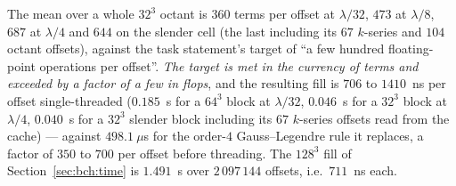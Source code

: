 The mean over a whole $32^3$ octant is $360$ terms per offset at $\lambda/32$, $473$ at
$\lambda/8$, $687$ at $\lambda/4$ and $644$ on the slender cell (the last including its
$67$ $k$-series and $104$ octant offsets), against the task statement's target of ``a few
hundred floating-point operations per offset''. \emph{The target is met in the currency of
terms and exceeded by a factor of a few in flops}, and the resulting fill is $706$ to
$1410$~ns per offset single-threaded ($0.185$~s for a $64^3$ block at $\lambda/32$,
$0.046$~s for a $32^3$ block at $\lambda/4$, $0.040$~s for a $32^3$ slender block including
its $67$ $k$-series offsets read from the cache) --- against $498.1~\mu$s for the order-$4$
Gauss--Legendre rule it replaces, a factor of $350$ to $700$ per offset before threading.
The $128^3$ fill of Section~\ref{sec:bch:time} is $1.491$~s over $2\,097\,144$ offsets,
i.e.\ $711$~ns each.
